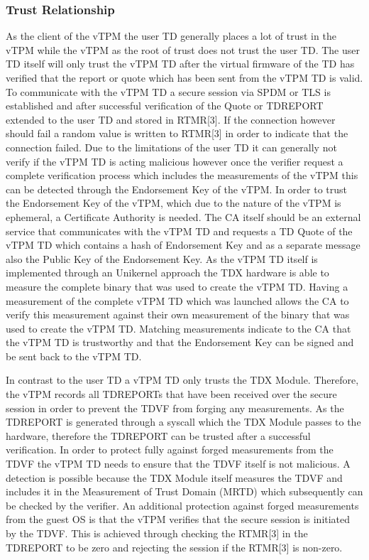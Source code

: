 \documentclass[sigplan,screen,nonacm]{acmart}
\begin{document}
\subsubsection{Trust Relationship}
As the client of the vTPM the user TD generally places a lot of trust in the vTPM while the vTPM as the root of trust does not trust the user TD.
The user TD itself will only trust the vTPM TD after the virtual firmware of the TD has verified that the report or quote which has been sent from the vTPM TD is valid.
To communicate with the vTPM TD a secure session via SPDM or TLS is established and after successful verification of the Quote or TDREPORT extended to the user TD and stored in RTMR[3].
If the connection however should fail a random value is written to RTMR[3] in order to indicate that the connection failed.
Due to the limitations of the user TD it can generally not verify if the vTPM TD is acting malicious however once the verifier request a complete verification process which includes the measurements of the vTPM this can be detected through the Endorsement Key of the vTPM.
In order to trust the Endorsement Key of the vTPM, which due to the nature of the vTPM is ephemeral, a Certificate Authority is needed.
The CA itself should be an external service that communicates with the vTPM TD and requests a TD Quote of the vTPM TD which contains a hash of Endorsement Key and as a separate message also the Public Key of the Endorsement Key.
As the vTPM TD itself is implemented through an Unikernel approach the TDX hardware is able to measure the complete binary that was used to create the vTPM TD.
Having a measurement of the complete vTPM TD which was launched allows the CA to verify this measurement against their own measurement of the binary that was used to create the vTPM TD.
Matching measurements indicate to the CA that the vTPM TD is trustworthy and that the Endorsement Key can be signed and be sent back to the vTPM TD.

In contrast to the user TD a vTPM TD only trusts the TDX Module.
Therefore, the vTPM records all TDREPORTs that have been received over the secure session in order to prevent the TDVF from forging any measurements.
As the TDREPORT is generated through a syscall which the TDX Module passes to the hardware, therefore the TDREPORT can be trusted after a successful verification.
In order to protect fully against forged measurements from the TDVF the vTPM TD needs to ensure that the TDVF itself is not malicious.
A detection is possible because the TDX Module itself measures the TDVF and includes it in the Measurement of Trust Domain (MRTD) which subsequently can be checked by the verifier.
An additional protection against forged measurements from the guest OS is that the vTPM verifies that the secure session is initiated by the TDVF.
This is achieved through checking the RTMR[3] in the TDREPORT to be zero and rejecting the session if the RTMR[3] is non-zero.
\end{document}
